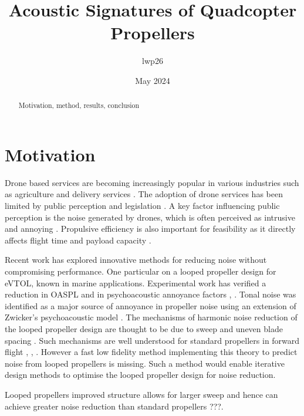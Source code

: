\documentclass{article}
\begin{document}
\title{Acoustic Signatures of Quadcopter Propellers}
\author{lwp26}
\date{May 2024}
\maketitle 

\begin{abstract}
    \centering
    Motivation, method, results, conclusion
\end{abstract}

\section{Motivation}
Drone based services are becoming increasingly popular in various industries such as agriculture and delivery services \cite{?}.
The adoption of drone services has been limited by public perception and legislation \cite{?}.
A key factor influencing public perception is the noise generated by drones, which is often perceived as intrusive and annoying \cite{?}.
Propulsive efficiency is also important for feasibility as it directly affects flight time and payload capacity \cite{?}.

Recent work has explored innovative methods for reducing noise without compromising performance.
One particular on a looped propeller design for eVTOL, known in marine applications.
Experimental work has verified a reduction in OASPL and in psychoacoustic annoyance factors \cite{shima_toroidal}, \cite{ijerph20031955} .
Tonal noise was identified as a major source of annoyance in propeller noise \cite{ijerph20031955} using an extension of Zwicker's psychoacoustic model \cite{DI2016164}.
The mechanisms of harmonic noise reduction of the looped propeller design are thought to be due to sweep and uneven blade spacing \cite{?}.
Such mechanisms are well understood for standard propellers in forward flight \cite{hanson_influence}, \cite{DOBRZYNSKI1993123}, \cite{doi:10.2514/3.22938}.
However a fast low fidelity method implementing this theory to predict noise from looped propellers is missing.
Such a method would enable iterative design methods to optimise the looped propeller design for noise reduction.

Looped propellers improved structure allows for larger sweep and hence can achieve greater noise reduction than standard propellers \cite{shima_toroidal} ???.
\end{document}
